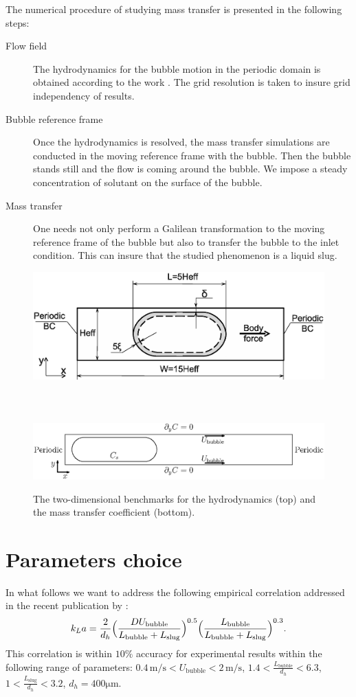 \documentclass{article}
\begin{document}
The numerical  procedure of studying mass transfer is presented in the following steps:
\begin{description}
 \item[Flow field] The hydrodynamics for the bubble motion in the periodic domain is obtained
according to the work \cite{kuzmin-binary2d}. The grid resolution is taken to insure grid
independency of results.  
 \item[Bubble reference frame] Once the hydrodynamics is resolved, the mass transfer simulations
are conducted in the moving
reference frame with the bubble. Then the bubble stands still and the flow is coming around the
bubble. We impose a steady concentration of solutant on the surface of the bubble.
\item[Mass transfer] One needs not only perform a Galilean transformation to the moving reference
frame of the bubble but also to
transfer the bubble to the inlet condition. This can insure that the studied phenomenon is a liquid
slug. 
\end{description}
\begin{figure}
\includegraphics[width=\textwidth]{Figures/benchmark_new.eps}\\
\\
\\
\\
\includegraphics[width=\textwidth]{Figures/benchmark_periodic.eps}
\caption{The two-dimensional benchmarks for the hydrodynamics (top) and the mass transfer
coefficient (bottom). \label{fig:benchmark}}
\end{figure}

\section{Parameters choice}
In what follows we want to address the following empirical correlation addressed in the recent
publication by \citet{yue-mass}:
\begin{equation}
k_L a=\frac{2}{d_h} \Bigl(\frac{D
U_{\mathrm{bubble}}}{L_{\mathrm{bubble}}+L_{\mathrm{slug}}}\Bigr)^{0.5}
\Bigl(\frac{L_{\mathrm{bubble}}}{L_{\mathrm{bubble}}+L_{\mathrm{slug}}}\Bigr)^{0.3}.
\end{equation}
This correlation is within $10\%$ accuracy for experimental results within the following range of
parameters: $0.4\,\mathrm{m/s}<U_{\mathrm{bubble}}<2\,\mathrm{m/s}$,
$1.4<\frac{L_{\mathrm{bubble}}}{d_h}<6.3$, $1<\frac{L_{\mathrm{slug}}}{d_h}<3.2$, $d_h = 400
\mathrm{\mu m}$.
\end{document}
